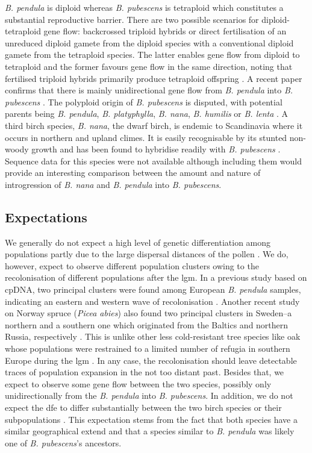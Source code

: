 \documentclass[hidelinks,11pt]{article}
\newcommand{\pendula}{\textit{B. pendula}}
\newcommand{\pubescens}{\textit{B. pubescens}}
\newcommand{\nana}{\textit{B. nana}}
\begin{document}
{    \pendula{} is diploid whereas \pubescens{} is tetraploid which constitutes a substantial reproductive barrier. There are two possible scenarios for diploid-tetraploid gene flow: backcrossed triploid hybrids or direct fertilisation of an unreduced diploid gamete from the diploid species with a conventional diploid gamete from the tetraploid species. The latter enables gene flow from diploid to tetraploid and the former favours gene flow in the same direction, noting that fertilised triploid hybrids primarily produce tetraploid offspring \cite{stebbins,birch-unidirectional-introgression}. A recent paper confirms that there is mainly unidirectional gene flow from \pendula{} into \pubescens{} \cite{birch-unidirectional-introgression}. The polyploid origin of \pubescens{} is disputed, with potential parents being \pendula{},  \textit{B. platyphylla}, \nana{}, \textit{B. humilis} or \textit{B. lenta} \cite{birch-phylogeny-polyploidy,jarkko}. A third birch species, \nana{}, the dwarf birch, is endemic to Scandinavia where it occurs in northern and upland climes. It is easily recognisable by its stunted non-woody growth and has been found to hybridise readily with \pubescens{} \cite{birch-hybridisation-nana-pubescens, birch-unidirectional-introgression}. Sequence data for this species were not available although including them would provide an interesting comparison between the amount and nature of introgression of \nana{} and \pendula{} into \pubescens{}.

    \subsection{Expectations}
    \label{sec:expectations}

    We generally do not expect a high level of genetic differentiation among populations partly due to the large dispersal distances of the pollen \cite{jarkko,recolonisation-birch}. We do, however, expect to observe different population clusters owing to the recolonisation of different populations after the \acrfull{lgm}. In a previous study based on cpDNA, two principal clusters were found among European \pendula{} samples, indicating an eastern and western wave of recolonisation \cite{recolonisation-birch}. Another recent study on Norway spruce (\textit{Picea abies}) also found two principal clusters in Sweden--a northern and a southern one which originated from the Baltics and northern Russia, respectively \cite{spruce-demography}. This is unlike other less cold-resistant tree species like oak whose populations were restrained to a limited number of refugia in southern Europe during the \acrshort{lgm} \cite{multispecies-structure-birch}. In any case, the recolonisation should leave detectable traces of population expansion in the not too distant past. Besides that, we expect to observe some gene flow between the two species, possibly only unidirectionally from the \pendula{} into \pubescens{}. In addition, we do not expect the \acrshort{dfe} to differ substantially between the two birch species or their subpopulations \cite{dfe-similarity-across-species}. This expectation stems from the fact that both species have a similar geographical extend and that a species similar to \pendula{} was likely one of \pubescens{}'s ancestors.

}
\end{document}
